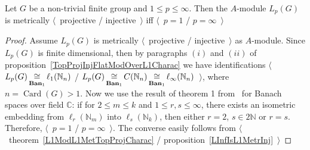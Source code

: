 \begin{proposition}\label{LpFinGrL1MGMetrInjProjCharac} Let $G$ be a non-trivial
finite group and $1\leq p\leq \infty$. Then the $A$-module $L_p(G)$ is
metrically $\langle$~projective / injective~$\rangle$ iff $\langle$~$p=1$ /
$p=\infty$~$\rangle$
\end{proposition}
\begin{proof} 
Assume $L_p(G)$ is metrically $\langle$~projective / injective~$\rangle$ as
$A$-module. Since $L_p(G)$ is finite dimensional, then by paragraphs $(i)$ and
$(ii)$ of proposition~\ref{TopProjInjFlatModOverL1Charac} we have 
identifications $\langle$~$L_p(G)\mathop{\mathbin{\cong}}\limits_{\mathbf{Ban}_1}\ell_1(\mathbb{N}_n)$ /
$L_p(G)
\mathop{\mathbin{\cong}}\limits_{\mathbf{Ban}_1}
C(\mathbb{N}_n)
\mathop{\mathbin{\cong}}\limits_{\mathbf{Ban}_1}
\ell_\infty(\mathbb{N}_n)$~$\rangle$, 
where $n=\operatorname{Card}(G)>1$. Now we use the result of theorem
1 from~\cite{LyubIsomEmdbFinDimLp} for Banach spaces over field $\mathbb{C}$: if
for $2\leq m\leq k$ and $1\leq r,s\leq \infty$, there exists an isometric
embedding from $\ell_r(\mathbb{N}_m)$ into $\ell_s(\mathbb{N}_k)$, then either
$r=2$, $s\in 2\mathbb{N}$ or $r=s$. Therefore, $\langle$~$p=1$ /
$p=\infty$~$\rangle$. The converse easily follows from
$\langle$~theorem~\ref{L1ModL1MetTopProjCharac} /
proposition~\ref{LInfIsL1MetrInj}~$\rangle$
\end{proof}

